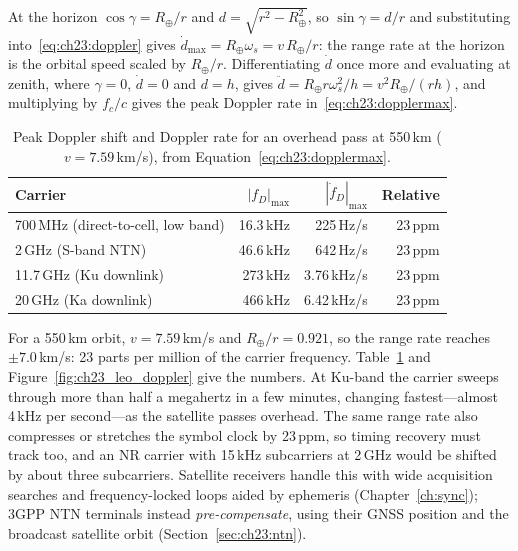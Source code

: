 \begin{deeper}
At the horizon $\cos\gamma=R_\oplus/r$ and $d=\sqrt{r^2-R_\oplus^2}$, so $\sin\gamma=d/r$ and
substituting into~\eqref{eq:ch23:doppler} gives $\dot d_{\max}=R_\oplus\omega_s=v\,R_\oplus/r$: the
range rate at the horizon is the orbital speed scaled by $R_\oplus/r$. Differentiating $\dot d$
once more and evaluating at zenith, where $\gamma=0$, $\dot d=0$ and $d=h$, gives
$\ddot d=R_\oplus r\omega_s^2/h=v^2R_\oplus/(rh)$, and multiplying by $f_c/c$ gives the peak Doppler
rate in~\eqref{eq:ch23:dopplermax}.
\end{deeper}

\begin{table}[htbp]\centering\small
\caption{Peak Doppler shift and Doppler rate for an overhead pass at 550\,km
($v=7.59$\,km/s), from Equation~\eqref{eq:ch23:dopplermax}.}\label{tab:ch23:doppler}
\begin{tabular}{@{}l r r r@{}}
\toprule
Carrier & $|f_D|_{\max}$ & $|\dot f_D|_{\max}$ & Relative\\
\midrule
700\,MHz (direct-to-cell, low band) & 16.3\,kHz & 225\,Hz/s & 23\,ppm\\
2\,GHz (S-band NTN) & 46.6\,kHz & 642\,Hz/s & 23\,ppm\\
11.7\,GHz (Ku downlink) & 273\,kHz & 3.76\,kHz/s & 23\,ppm\\
20\,GHz (Ka downlink) & 466\,kHz & 6.42\,kHz/s & 23\,ppm\\
\bottomrule
\end{tabular}
\end{table}

For a 550\,km orbit, $v=7.59$\,km/s and $R_\oplus/r=0.921$, so the range rate reaches
$\pm7.0$\,km/s: 23 parts per million of the carrier frequency. Table~\ref{tab:ch23:doppler}
and Figure~\ref{fig:ch23_leo_doppler} give the numbers. At Ku-band the carrier sweeps through
more than half a megahertz in a few minutes, changing fastest---almost 4\,kHz per
second---as the satellite passes overhead. The same range rate also compresses or stretches
the symbol clock by 23\,ppm, so timing recovery must track too, and an NR carrier with
15\,kHz subcarriers at 2\,GHz would be shifted by about three subcarriers. Satellite receivers
handle this with wide acquisition searches and frequency-locked loops aided by ephemeris
(Chapter~\ref{ch:sync}); 3GPP NTN terminals instead \emph{pre-compensate}, using their GNSS
position and the broadcast satellite orbit (Section~\ref{sec:ch23:ntn}).

